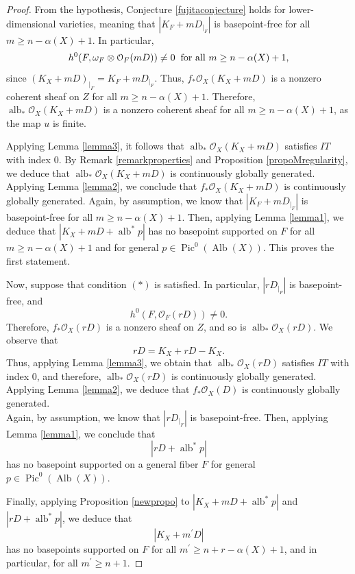 \documentclass[sn-mathphys-num]{sn-jnl}%
\theoremstyle{definition}
\numberwithin{equation}{section}
\begin{document}
\begin{proof}
From the hypothesis, Conjecture \ref{fujitaconjecture} holds for lower-dimensional varieties, meaning that $|K_{F}+ mD_{|_{F}}|$ is basepoint-free for all $m \geq n - \alpha(X) +1$. In particular,
$$h^{0}(F, \omega_{F} \otimes \mathcal{O}_{F}(mD)) \neq 0 \hspace{0.2cm} \text{for all }  m \geq n-\alpha(X)+1 \text{,}$$
since $(K_{X} +mD)_{|_{F}} = K_{F} + mD_{|_{F}}$.
Thus, $f_{*}\mathcal{O}_{X}(K_{X} + mD)$ is a nonzero coherent sheaf on $Z$ for all $m \geq n- \alpha(X)+1$. Therefore, $\operatorname{alb}_{*}\mathcal{O}_{X}(K_{X} +mD)$ is a nonzero coherent sheaf for all $m \geq n-\alpha(X)+1$, as the map $u$ is finite. 
\par Applying Lemma \ref{lemma3}, it follows that  $\operatorname{alb}_{*}\mathcal{O}_{X}(K_{X} +mD)$ satisfies $IT$ with index $0$. By Remark \ref{remarkproperties} and Proposition \ref{propoMregularity}, we deduce that $\operatorname{alb}_{*}\mathcal{O}_{X}(K_{X} +mD)$ is continuously globally generated.
\\Applying Lemma \ref{lemma2}, we conclude that $f_{*}\mathcal{O}_{X}(K_{X} + mD)$ is continuously globally generated. Again, by assumption, we know that $|K_{F}+ mD_{|_{F}}|$ is basepoint-free for all $m \geq n - \alpha(X) +1$. Then, applying Lemma \ref{lemma1}, we deduce that  $|K_{X} + mD + \operatorname{alb}^{*}p|$ has no  basepoint supported on $F$ for all $m \geq n-\alpha(X)+1$ and for general $p \in \operatorname{Pic}^{0}(\operatorname{Alb}(X))$. This proves the first statement.
\par Now, suppose that condition $(*)$ is satisfied. In particular, $|rD_{|_{F}}|$ is basepoint-free, and 
\[
h^{0}(F, \mathcal{O}_{F}(rD)) \neq 0.
\]
Therefore, $f_{*}\mathcal{O}_{X}(rD)$ is a nonzero sheaf on $Z$, and so is $\operatorname{alb}_{*}\mathcal{O}_{X}(rD)$. We  observe that
\[
rD = K_{X} + rD -K_{X}.
\]
Thus, applying Lemma \ref{lemma3}, we obtain that  $\operatorname{alb}_{*}\mathcal{O}_{X}(rD)$ satisfies $IT$ with index $0$, and therefore,  $\operatorname{alb}_{*}\mathcal{O}_{X}(rD)$ is continuously globally generated. Applying Lemma \ref{lemma2}, we deduce that $f_{*}\mathcal{O}_{X}(D)$ is continuously globally generated.
\\Again, by assumption, we know that $|rD_{|_{F}}|$ is basepoint-free. Then, applying Lemma \ref{lemma1}, we conclude that 
  $$|rD + \operatorname{alb}^{*}p|$$ has no basepoint supported on a general fiber $F$  for general $p \in \operatorname{Pic}^{0}(\operatorname{Alb}(X))$.
\par Finally, applying Proposition \ref{newpropo} to $|K_{X} + mD + \operatorname{alb}^{*}p|$ and $|rD + \operatorname{alb}^{*}p|$, we deduce that  $$|K_{X} + m^{'}D|$$ has no  basepoints supported on $F$ for all $m^{'} \geq n + r-\alpha(X)+1$, and in particular, for all $m^{'} \geq n+1$. 
\end{proof}
\end{document}
